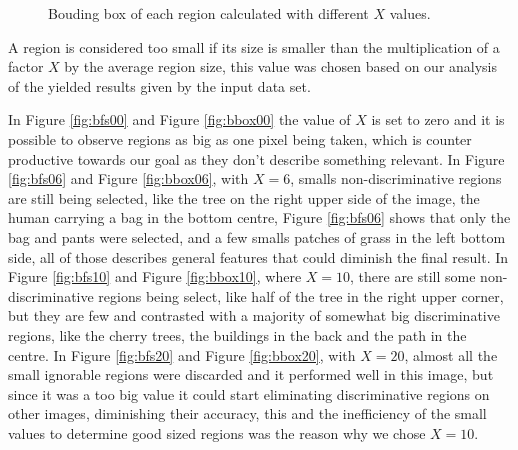 \documentclass[12pt,a4paper]{article}
\begin{document}
\begin{figure}[!h]
{{		}
		\label{fig:bbox10}
	}
	\quad
	\caption{Bouding box of each region calculated with different $X$ values.}
	\label{fig:bbox}
\end{figure}

	A region is considered too small if its size is smaller than the multiplication of a factor $X$ by the average region size, this value was chosen based on our analysis of the yielded results given by the input data set.
	
	In Figure \ref{fig:bfs00} and Figure \ref{fig:bbox00} the value of $X$ is set to zero and it is possible to observe regions as big as one pixel being taken, which is counter productive towards our goal as they don't describe something relevant. In Figure \ref{fig:bfs06} and Figure \ref{fig:bbox06}, with $X = 6$, smalls non-discriminative regions are still being selected, like the tree on the right upper side of the image, the human carrying a bag in the bottom centre, Figure \ref{fig:bfs06} shows that only the bag and pants were selected, and a few smalls patches of grass in the left bottom side, all of those describes general features that could diminish the final result. In Figure \ref{fig:bfs10} and Figure \ref{fig:bbox10}, where $X = 10$, there are still some non-discriminative regions being select, like half of the tree in the right upper corner, but they are few and contrasted with a majority of somewhat big discriminative regions, like the cherry trees, the buildings in the back and the path in the centre. In Figure \ref{fig:bfs20} and Figure \ref{fig:bbox20}, with $X = 20$, almost all the small ignorable regions were discarded and it performed well in this image, but since it was a too big value it could start eliminating discriminative regions on other images, diminishing their accuracy, this and the inefficiency of the small values to determine good sized regions was the reason why we chose $X = 10$.
\end{document}
